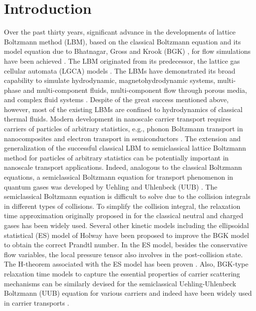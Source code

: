 \documentclass[aip,jmp,amsmath,amssymb,reprint,noshowpacs]{revtex4-1}
\begin{document}
\section{Introduction}
\label{sec:1}
Over the past thirty years, significant advance in the developments of lattice Boltzmann method (LBM), based on the classical Boltzmann equation and its model equation due to Bhatnagar, Gross and Krook (BGK) \cite{BGK1954}, for flow simulations have been achieved \cite{ChenD1998, Succi2001, Aidun2010}.
The LBM originated from its predecessor, the lattice gas cellular automata (LGCA) models \cite{Frisch1, McN1988}.
The LBMs have demonstrated its broad capability to simulate hydrodynamic, magnetohydrodynamic systems, multi-phase and multi-component fluids, multi-component
flow through porous media, and complex fluid systems \cite{Qian1, Chen1992, Rot1994, Mrt2002}.
Despite of the great success mentioned above, however, most of the existing LBMs are confined to hydrodynamics of classical thermal fluids.
Modern development in nanoscale carrier transport requires carriers of particles of arbitrary statistics, e.g., phonon Boltzmann transport in nanocomposites and electron transport in semiconductors \cite{Lund2000, Chen2005}. The extension and generalization of the successful classical LBM to semiclassical lattice Boltzmann method for particles of arbitrary statistics can be potentially important in nanoscale transport applications.  Indeed, analogous to the classical Boltzmann equations, a semiclassical Boltzmann equation for transport phenomenon in quantum gases was developed by Uehling and Uhlenbeck (UUB) \cite{Ueh1933}.
The semiclassical Boltzmann equation is difficult to solve due to the collision integrals in different types of collisions. To simplify the collision integral,
the relaxation time approximation originally proposed in \cite{BGK1954} for the classical neutral and charged gases has been widely used.  Several other kinetic models including the ellipsoidal statistical (ES) model of Holway \cite{Holway1966} have been proposed to improve the BGK model to obtain the correct Prandtl number.  In the ES model, besides the conservative flow variables, the local pressure tensor also involves in the post-collision state.  The H-theorem associated with the ES model has been proven \cite{Andries2000}.  Also, BGK-type relaxation time models to capture the essential properties of carrier scattering mechanisms can be similarly devised for the semiclassical Uehling-Uhlenbeck Boltzmann (UUB) equation for various carriers and indeed have been widely used in carrier transports \cite{Lund2000, Chen2005}.
\end{document}
